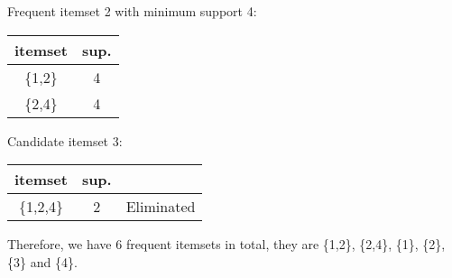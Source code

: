 \documentclass{article}
\begin{document}
Frequent itemset 2 with minimum support 4:
\begin{center}
    \begin{tabular}{| c | c |}
        \hline
        itemset & sup.\\ 
        \hline
        \{1,2\} & 4\\  
        \hline
        \{2,4\} & 4\\  
        \hline
    \end{tabular}
\end{center}

Candidate itemset 3:
\begin{center}
    \begin{tabular}{| c | c | c |}
        \hline
        itemset & sup. & \\ 
        \hline
        \{1,2,4\} & 2 & Eliminated\\  
        \hline
    \end{tabular}
\end{center}

Therefore, we have 6 frequent itemsets in total, they are \{1,2\}, \{2,4\}, \{1\}, \{2\}, \{3\} and \{4\}.
\end{document}
